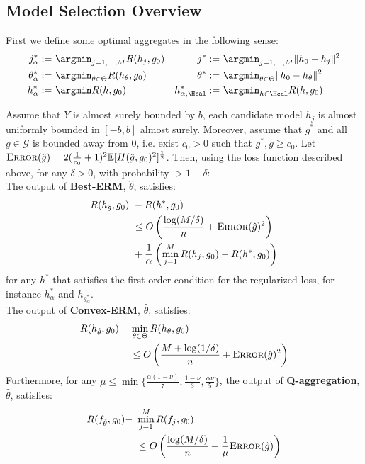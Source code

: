 \documentclass[12pt]{extarticle} %
\newcommand{\E}{\mathbb{E}}
\newcommand{\error}{\ensuremath{\textsc{Error}}}
\begin{document}
\subsection{Model Selection Overview}
First we define some optimal aggregates in the following sense:
\begin{align*}
    j^*_{\alpha} :=~& \argmin_{j = 1, \dots, M}  R(h_{j},g_0) &
    j^* :=~& \argmin_{j = 1, \dots, M} \|h_0 - h_j\|^2\\
    \theta^*_{\alpha} :=~& \argmin_{\theta \in \Theta} R(h_{\theta},g_0) &
    \theta^* :=~& \argmin_{\theta \in \Theta} \|h_0 - h_{\theta}\|^2\\
    h_{\alpha}^* :=~& \argmin R(h,g_0) &
    h_{\alpha, \Hcal}^* :=~& \argmin_{h \in \Hcal} R(h,g_0)
\end{align*}
\begin{theorem}  \label{thm:oracle_model_selection}
    Assume that $Y$ is almost surely bounded by $b$, each candidate model $h_j$ is almost uniformly bounded in $[-b,b]$ almost surely. Moreover, assume that $g^*$ and all $g\in \mathcal{G}$ is bounded away from 0, i.e. exist $c_0>0$ such that $g^*, g\geq c_0$. Let $\error(\hat{g}) = 2(\frac{1}{c_0}+1)^2\E[H(\hat{g},g_0)^2]^\frac{1}{2}$. Then, using the loss function described above, for any $\delta>0$, with probability $>1-\delta$:\\
    The output of \textbf{Best-ERM}, $\hat{\theta}$, satisfies:
    \begin{align*}
        R(h_{\hat{\theta}},g_0)~& -R(h^*,g_0)\\
        ~&\leq O\left(\frac{\log(M/\delta)}{n} + \error(\hat{g})^2\right)\\
        ~& +  \frac{1}{\alpha}\left(\min_{j=1}^M R(h_j, g_0) - R(h^*,g_0) \right)
    \end{align*} for any $h^*$ that satisfies the first order condition for the regularized loss, for instance $h_{\alpha}^*$ and $h_{\theta_{\alpha}^*}$.\\ 
    The output of \textbf{Convex-ERM}, $\hat{\theta}$, satisfies:
    \begin{align*}
        R(h_{\hat{\theta}},g_0) - ~&\min_{\theta\in\Theta}R(h_\theta,g_0)\\
        ~&\leq O\left(\frac{M+\log(1/\delta)}{n} + \error(\hat{g})^2\right)
    \end{align*}
     Furthermore, for any $\mu \leq \min\{\frac{\alpha(1-\nu)}{7}, \frac{1-\nu}{3}, \frac{\alpha\nu}{5}\}$, the output of \textbf{Q-aggregation}, $\hat{\theta}$, satisfies: 
    \begin{align*}
        R(f_{\hat{\theta}}, g_0) -~&\min_{j=1}^M R(f_j, g_0)\\
        ~&\leq O\left(\frac{\log(M/\delta)}{n} + \frac{1}{\mu}\error(\hat{g})\right)\\
    \end{align*}
\end{theorem}
\end{document}
